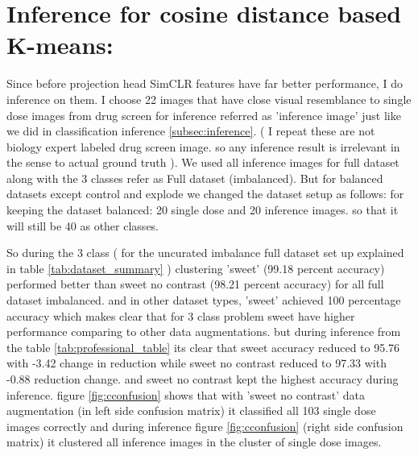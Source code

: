 \section{Inference for cosine distance based K-means:}
Since before projection head SimCLR features have far better performance, I do  inference on them. I choose 22 images that have close visual resemblance to single dose images from drug screen for inference referred as 'inference image' just like we did in classification inference \ref{subsec:inference}. ( I repeat these are not biology expert labeled drug screen image. so any inference result is irrelevant in the sense to actual ground truth ). We used all inference images for full dataset along with the 3 classes refer as Full dataset (imbalanced). But for balanced datasets except control and explode we changed the  dataset setup as follows: for keeping the dataset balanced: 20 single dose and 20 inference images. so that it will still be 40 as other classes.

So during the 3 class ( for the uncurated imbalance full dataset set up explained in table \ref{tab:dataset_summary} ) clustering 'sweet' (99.18 percent accuracy) performed better than sweet no contrast (98.21 percent accuracy) for all full dataset imbalanced. and in other dataset types, 'sweet' achieved 100 percentage accuracy which makes clear that for 3 class problem sweet have higher performance comparing to other data augmentations. but during inference from the table \ref{tab:professional_table} its clear that sweet accuracy reduced to 95.76  with -3.42 change in reduction while sweet no contrast reduced to  97.33 with -0.88 reduction change. and sweet no contrast kept the highest accuracy during inference. figure \ref{fig:cconfusion} shows that with 'sweet no contrast' data augmentation (in left side confusion matrix) it classified all 103 single dose images correctly and during inference figure \ref{fig:cconfusion} (right side confusion matrix) it clustered all inference images in the cluster of single dose images.

